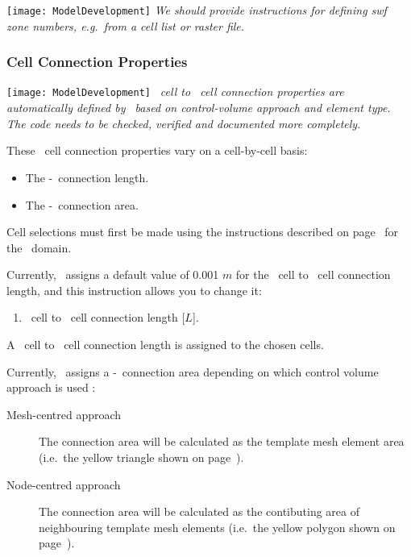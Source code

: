 \texttt{[image: ModelDevelopment]} \textit{We should provide instructions for defining swf zone numbers, e.g.\ from a cell list or raster file.}

\subsubsection{Cell Connection Properties}  
\texttt{[image: ModelDevelopment]} \textit{
\swf\ cell to \swf\ cell connection properties are automatically defined by \mut\ based on control-volume approach and element type. The code needs to be checked, verified and documented more completely.}

These \swf\ cell connection properties vary on a cell-by-cell basis:
\begin{itemize}
     \item The \swf-\gwf\ connection length.
     \item The \swf-\gwf\ connection area.
\end{itemize}

Cell selections must first be made using the instructions described on page~\pageref{page:cellSelect} for the \gwf\ domain.

Currently, \mut\ assigns a default value of 0.001 $m$ for the \swf\ cell to \gwf\ cell connection length, and this instruction allows you to change it:

    {
        \squish
        \begin{enumerate}
        \item {}  \swf\ cell to \gwf\ cell connection length [$L$].
        \end{enumerate}
          A \swf\ cell to \gwf\ cell connection length  is assigned to the chosen cells.
    }

Currently, \mut\ assigns a \swf-\gwf\ connection area depending on which control volume approach is used :
\begin{description}
\item [Mesh-centred approach] The connection area will be calculated as the template mesh element area (i.e.\ the yellow triangle shown on page~\pageref{page:MeshCentredApproach}).
\item [Node-centred approach] The connection area will be calculated as  the contibuting area of neighbouring template mesh elements (i.e.\ the yellow polygon shown on page~\pageref{page:NodeCentredApproach}).
\end{description}

